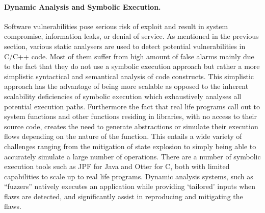 \documentclass[a4paper,11pt]{article}
\newcommand{\project}[1]{\textbf{#1}\xspace}
\newcommand{\SECURITY}{\project{Elysian}}
\newcommand{\TheProject}{\SECURITY}
\begin{document}
\paragraph{Dynamic Analysis and Symbolic Execution.}
Software vulnerabilities pose serious risk of exploit and result in system compromise, information leaks, or denial of service. As mentioned in the previous section, various static analysers are used to detect potential vulnerabilities in C/C++ code. Most of them suffer from high amount of false alarms mainly due to the fact that they do not use a symbolic execution approach but rather a more simplistic syntactical and semantical analysis of code constructs. This simplistic approach has the advantage of being more scalable as opposed to the inherent scalability deficiencies of symbolic execution which exhaustively analyses all potential execution paths. Furthermore the fact that real life programs call out to system functions and other functions residing in libraries, with no access to their source code, creates the need to generate abstractions or simulate their execution flows depending on the nature of the function. This entails a wide variety of challenges ranging from the mitigation of state explosion to simply being able to accurately simulate a large number of operations. There are a number of symbolic execution tools such as JPF for Java and Otter for C, both with limited capabilities to scale up to real life programs.
%
Dynamic analysis systems, such as “fuzzers” natively executes an application while providing ‘tailored’ inputs when flaws are detected, and significantly assist in reproducing and mitigating the flaws. 

\end{document}
